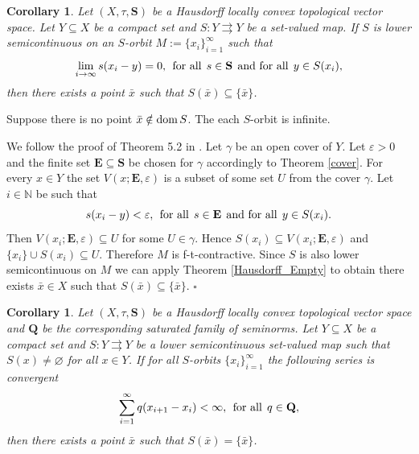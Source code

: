 \documentclass{article}
\def\dom{\mathop{\rm dom}}
\renewcommand{\emptyset}{\varnothing}
\def\dom{\mathop{\rm dom}}
\def\dom{\mathop{\rm dom}}
\def\text#1{\,\;\hbox{#1}\;\,}
\newcommand{\N}{\mathbb{N}}
\renewenvironment{proof}
         {\begin{trivlist}\item[
         {\bf Proof.}]}{{\hfill $\square$} \end{trivlist}}
\newtheorem{cor}[theo]{Corollary}
\begin{document}
\begin{cor} \label{fixed_point_weak}
Let $(X, \tau, \mathbf{S})$ be a Hausdorff locally convex topological vector space. Let $Y \subseteq X$ be a compact set and $S : Y \rightrightarrows Y$ be a set-valued map. If $S$ is lower semicontinuous on an $S$-orbit $M:=\{x_i\}_{i=1}^{\infty}$ such
that 
\[\lim_{i \rightarrow \infty} s(x_i-y) = 0, \text{for all} s \in \mathbf{S} \text{and for all} y \in S(x_i),\]
then there exists a point $\bar{x}$ such that $S(\bar{x}) \subseteq \{\bar{x}\}$.
\end{cor}
\begin{proof} Suppose there is no point $\bar{x} \notin \dom S$. The each $S$-orbit is infinite. 

We follow the proof of Theorem 5.2 in \cite{MR}. Let $\gamma$ be an open cover of $Y$. Let $\varepsilon > 0$ and the finite set
$\mathbf{E} \subseteq \mathbf{S}$ be chosen for $\gamma$ accordingly to Theorem \ref{cover}. For every
$x \in Y$ the set $V (x;\mathbf{E}, \varepsilon)$ is a subset of some set $U$ from the cover $\gamma$. Let $i \in \N$ be
such that  
\[ s(x_i-y) < \varepsilon, \text{for all} s \in \mathbf{E} \text{and for all} y \in S(x_i).\] Then $V(x_i;\mathbf{E},\varepsilon) \subseteq U$ for some $U \in \gamma$.
Hence $S(x_i) \subseteq V(x_i;\mathbf{E},\varepsilon)$ and $\{x_i\} \cup S(x_i) \subseteq U$. Therefore $M$ is f-t-contractive. Since $S$ is also lower semicontinuous on $M$ we can apply Theorem \ref{Hausdorff_Empty} to obtain there exists $\bar{x} \in X$ such that $S(\bar{x}) \subseteq \{\bar{x}\}$.
\end{proof}
\begin{cor} \label{fixed_point_sat}
Let $(X, \tau, \mathbf{S})$ be a Hausdorff locally convex topological vector space and $\mathbf{Q}$ be the corresponding saturated family of seminorms. Let $Y \subseteq X$ be a compact set and $S : Y \rightrightarrows Y$ be a lower semicontinuous set-valued map such that $S(x) \neq \emptyset$ for all $x \in Y$. If for all $S$-orbits $\{x_i\}_{i=1}^{\infty}$ the following series is convergent 
\begin{equation} \label{summable}
\sum_{i=1}^{\infty} q(x_{i+1}-x_i) < \infty, \text{for all} q \in \mathbf{Q}, 
\end{equation}
then there exists a point $\bar{x}$ such that $S(\bar{x}) = \{\bar{x}\}$.
\end{cor}
\end{document}
